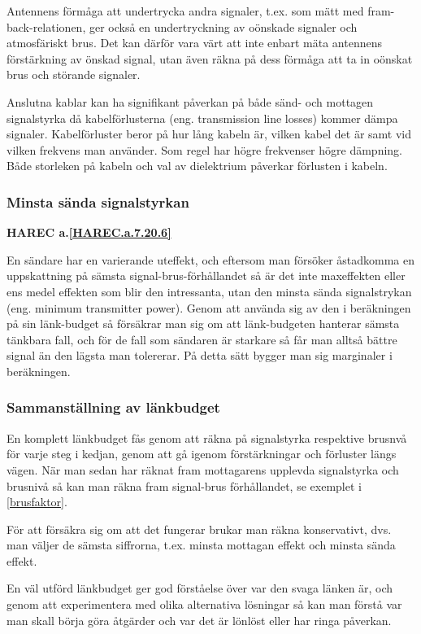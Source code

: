 Antennens förmåga att undertrycka andra signaler, t.ex. som mätt med
fram-back-relationen, ger också en undertryckning av oönskade signaler och
atmosfäriskt brus.
Det kan därför vara värt att inte enbart mäta antennens förstärkning av
önskad signal, utan även räkna på dess förmåga att ta in oönskat brus och
störande signaler.

Anslutna kablar kan ha signifikant påverkan på både sänd- och mottagen
signalstyrka då kabelförlusterna (eng. transmission line losses) kommer dämpa
signaler.
Kabelförluster beror på hur lång kabeln är, vilken kabel det är samt vid
vilken frekvens man använder.
Som regel har högre frekvenser högre dämpning.
Både storleken på kabeln och val av dielektrium påverkar förlusten i kabeln.


\subsubsection{Minsta sända signalstyrkan}
\textbf{HAREC a.\ref{HAREC.a.7.20.6}\label{myHAREC.a.7.20.6}}

En sändare har en varierande uteffekt, och eftersom man försöker åstadkomma en
uppskattning på sämsta signal-brus-förhållandet så är det inte maxeffekten
eller ens medel effekten som blir den intressanta, utan den minsta sända
signalstrykan (eng. minimum transmitter power).
Genom att använda sig av den i beräkningen på sin länk-budget så försäkrar man
sig om att länk-budgeten hanterar sämsta tänkbara fall, och för de fall som
sändaren är starkare så får man alltså bättre signal än den lägsta man
tolererar.
På detta sätt bygger man sig marginaler i beräkningen.

\subsubsection{Sammanställning av länkbudget}

En komplett länkbudget fås genom att räkna på signalstyrka respektive brusnvå
för varje steg i kedjan, genom att gå igenom förstärkningar och förluster
längs vägen.
När man sedan har räknat fram mottagarens upplevda signalstyrka och brusnivå så
kan man räkna fram signal-brus förhållandet, se exemplet i \ref{brusfaktor}.

För att försäkra sig om att det fungerar brukar man räkna konservativt, dvs.
man väljer de sämsta siffrorna, t.ex. minsta mottagan effekt och minsta sända
effekt.

En väl utförd länkbudget ger god förståelse över var den svaga länken är,
och genom att experimentera med olika alternativa lösningar så kan man
förstå var man skall börja göra åtgärder och var det är lönlöst eller har
ringa påverkan.
